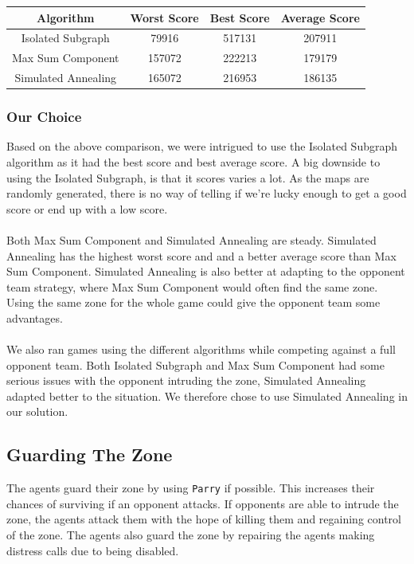 \documentclass[11pt]{article}
\begin{document}
\begin{center}
\begin{tabular}{ | c | c | c | c | }
	\hline
	Algorithm & Worst Score & Best Score & Average Score\\ \hline
	Isolated Subgraph & 79916 & 517131 & 207911 \\
	Max Sum Component & 157072 & 222213 & 179179 \\
	Simulated Annealing & 165072 & 216953 & 186135 \\
\hline
\end{tabular}
\end{center}



\subsubsection{Our Choice}
Based on the above comparison, we were intrigued to use the Isolated Subgraph algorithm as it had the best score and best average score. A big downside to using the Isolated Subgraph, is that it scores varies a lot. As the maps are randomly generated, there is no way of telling if we're lucky enough to get a good score or end up with a low score.\\
\\
Both Max Sum Component and Simulated Annealing are steady. Simulated Annealing has the highest worst score and and a better average score than Max Sum Component. Simulated Annealing is also better at adapting to the opponent team strategy, where Max Sum Component would often find the same zone. Using the same zone for the whole game could give the opponent team some advantages.\\
\\
We also ran games using the different algorithms while competing against a full opponent team. Both Isolated Subgraph and Max Sum Component had some serious issues with the opponent intruding the zone, Simulated Annealing adapted better to the situation. We therefore chose to use Simulated Annealing in our solution.

\subsection{Guarding The Zone}
The agents guard their zone by using {\tt Parry} if possible. This increases their chances of surviving if an opponent attacks. If opponents are able to intrude the zone, the agents attack them with the hope of killing them and regaining control of the zone. The agents also guard the zone by repairing the agents making distress calls due to being disabled.
\end{document}
